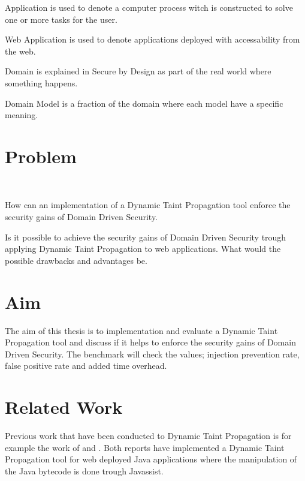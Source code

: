 \begin{definition}{Application} 
	is used to denote a computer process witch is constructed to solve one or more tasks for the user.
\end{definition}

\begin{definition}{Web Application} 
	is used to denote applications deployed with accessability from the web.
\end{definition}

\begin{definition}{Domain}
	is explained in Secure by Design \parencite{sbd2018} as part of the real world where something happens.
\end{definition}

\begin{definition}{Domain Model}
	is a fraction of the domain where each model have a specific meaning.
\end{definition}


\section{Problem}
\hfill \\
\begin{chapquote}{}
	How can an implementation of a Dynamic Taint Propagation tool enforce the security gains of Domain Driven Security.
\end{chapquote}

\noindent
Is it possible to achieve the security gains of Domain Driven Security trough applying Dynamic Taint Propagation to web applications. What would the possible drawbacks and advantages be.


\section{Aim}
The aim of this thesis is to implementation and evaluate a Dynamic Taint Propagation tool and discuss if it helps to enforce the security gains of Domain Driven Security. The benchmark will check the values; injection prevention rate, false positive rate and added time overhead. 


\section{Related Work}
Previous work that have been conducted to Dynamic Taint Propagation is for example the work of \textcite{Haldar} and \textcite{Zhao2016}. Both reports have implemented a Dynamic Taint Propagation tool for web deployed Java applications where the manipulation of the Java bytecode is done trough Javassist.

